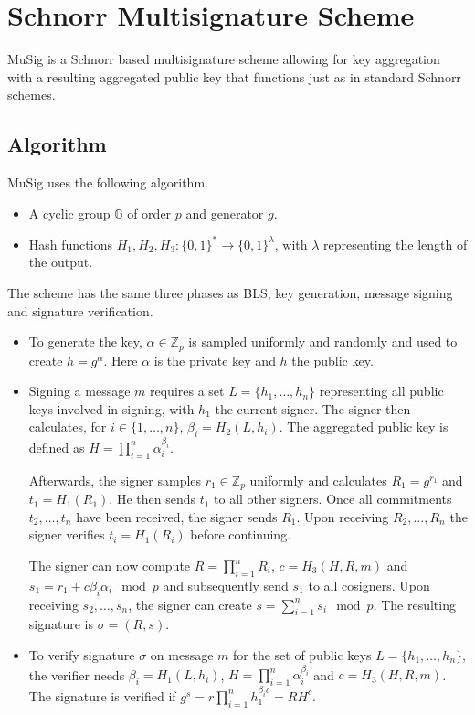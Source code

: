 \chapter{Schnorr Multisignature Scheme}
MuSig \cite{SchnorrMulti} is a Schnorr based multisignature scheme allowing for key aggregation with a resulting aggregated public key that functions just as in standard Schnorr schemes. 
\section{Algorithm}
MuSig uses the following algorithm.
\begin{itemize}
	\item A cyclic group $\mathbb{G}$ of order $p$ and generator $g$.
	\item Hash functions $H_1,H_2,H_3: \{0,1\}^*\to\{0,1\}^\lambda$, with $\lambda$ representing the length of the output.
\end{itemize}
The scheme has the same three phases as BLS, key generation, message signing and signature verification.
\begin{itemize}
	\item To generate the key, $\alpha\in\mathbb{Z}_p$ is sampled uniformly and randomly and used to create $h=g^\alpha$. Here $\alpha$ is the private key and $h$ the public key.
	\item Signing a message $m$ requires a set $L=\{h_1,\dots,h_n\}$ representing all public keys involved in signing, with $h_1$ the current signer. The signer then calculates, for $i\in\{1,\dots,n\}$, $\beta_i=H_2(L,h_i)$. The aggregated public key is defined as $H=\prod_{i=1}^{n}\alpha_i^{\beta_i}$.
	
	Afterwards, the signer samples $r_1\in\mathbb{Z}_p$ uniformly and calculates $R_1=g^{r_1}$ and $t_1=H_1(R_1)$. He then sends $t_1$ to all other signers. Once all commitments $t_2,\dots,t_n$ have been received, the signer sends $R_1$. Upon receiving $R_2,\dots,R_n$ the signer verifies $t_i=H_1(R_i)$ before continuing.
	
	The signer can now compute $R=\prod_{i=1}^{n}R_i$, $c=H_3(H,R,m)$ and $s_1=r_1+c\beta_i\alpha_i\mod{p}$ and subsequently send $s_1$ to all cosigners. Upon receiving $s_2,\dots,s_n$, the signer can create $s=\sum_{i=1}^{n}s_i\mod{p}$. The resulting signature is $\sigma=(R,s)$.
	\item To verify signature $\sigma$ on message $m$ for the set of public keys $L=\{h_1,\dots,h_n\}$, the verifier needs $\beta_i=H_1(L,h_i)$, $H=\prod_{i=1}^{n}\alpha_i^{\beta_i}$ and $c=H_3(H,R,m)$. The signature is verified if $g^s=r\prod_{i=1}^{n}h_1^{\beta_ic}=RH^c$.
\end{itemize}
